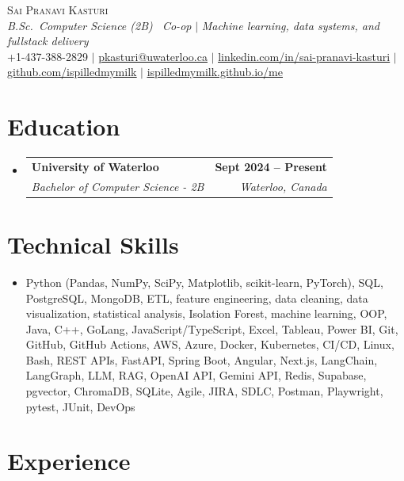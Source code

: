 \documentclass[letterpaper,10pt]{article}
\makeatletter
\newcommand{\resumeSubheading}[4]{
  \vspace{-1pt}\item
    \begin{tabular*}{1.0\textwidth}[t]{l@{\extracolsep{\fill}}r}
      \textbf{#1} & \textbf{\small #2} \\
      \textit{\small#3} & \textit{\small #4} \\[-2pt]
    \end{tabular*}\vspace{-7pt}
}
\newcommand{\resumeSubHeadingListStart}{\begin{itemize}[leftmargin=0.0in, label={}]}
\newcommand{\resumeSubHeadingListEnd}{\end{itemize}}
\makeatother
\begin{document}

\vspace{-14pt}
\begin{center}
    {\Huge \scshape Sai Pranavi Kasturi} \\
    \vspace{2pt}
    \small \textit{B.Sc.\ Computer Science (2B) \textemdash\ Co-op} $|$ \textit{Machine learning, data systems, and full\textendash stack delivery} \\
    \vspace{4pt}
    \small +1-437-388-2829 $|$ \underline{pkasturi@uwaterloo.ca} $|$ \href{https://linkedin.com/in/sai-pranavi-kasturi-704807298}{\underline{linkedin.com/in/sai-pranavi-kasturi}} $|$ \href{https://github.com/ispilledmymilk}{\underline{github.com/ispilledmymilk}} $|$ \href{https://ispilledmymilk.github.io/me/}{\underline{ispilledmymilk.github.io/me}}
\end{center}
\vspace{0pt}
\section{Education}
  \resumeSubHeadingListStart
    \resumeSubheading
      {University of Waterloo}{Sept 2024 -- Present}
      {Bachelor of Computer Science - 2B}{Waterloo, Canada}
  \resumeSubHeadingListEnd
\vspace{-4pt}
\section{Technical Skills}
\begin{itemize}[leftmargin=0.05in, label={}]
  \small\item{
    Python (Pandas, NumPy, SciPy, Matplotlib, scikit-learn, PyTorch), SQL, PostgreSQL, MongoDB, ETL, feature engineering, data cleaning, data visualization, statistical analysis, Isolation Forest, machine learning, OOP, Java, C++, GoLang, JavaScript/TypeScript, Excel, Tableau, Power BI, Git, GitHub, GitHub Actions, AWS, Azure, Docker, Kubernetes, CI/CD, Linux, Bash, REST APIs, FastAPI, Spring Boot, Angular, Next.js, LangChain, LangGraph, LLM, RAG, OpenAI API, Gemini API, Redis, Supabase, pgvector, ChromaDB, SQLite, Agile, JIRA, SDLC, Postman, Playwright, pytest, JUnit, DevOps
  }
\end{itemize}
\vspace{-4pt}
\section{Experience}
\end{document}
